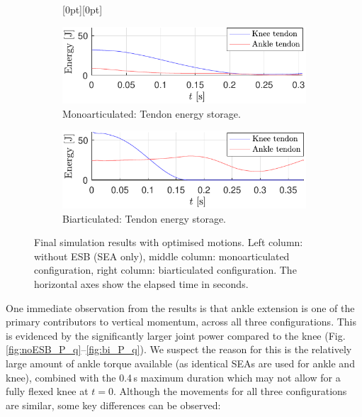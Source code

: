 \documentclass[letterpaper, 10 pt, conference]{ieeeconf}  %
\begin{document}
\begin{figure}[ht]
	\begin{subfigure}[t]{0.32\linewidth}
		\centering
		\raisebox{0pt}[0pt][0pt]{%
		}
	\end{subfigure}
	\begin{subfigure}[t]{0.32\linewidth}
		\includegraphics[width=\linewidth]{mono/ESB_storage}
		\caption{Monoarticulated: Tendon energy storage.}
		\label{fig:mono_ESB}
	\end{subfigure}
	\begin{subfigure}[t]{0.32\linewidth}
		\includegraphics[width=\linewidth]{bi/ESB_storage}
		\caption{Biarticulated: Tendon energy storage.}
		\label{fig:bi_ESB}
	\end{subfigure}
	
	\caption{Final simulation results with optimised motions. Left column: without ESB (SEA only), middle column: monoarticulated configuration, right column: biarticulated configuration. The horizontal axes show the elapsed time in seconds.}
	\label{fig:opt_results}
\end{figure}

One immediate observation from the results is that ankle extension is one of the primary contributors to vertical momentum, across all three configurations. This is evidenced by the significantly larger joint power compared to the knee (Fig. \ref{fig:noESB_P_q}--\ref{fig:bi_P_q}). We suspect the reason for this is the relatively large amount of ankle torque available (as identical SEAs are used for ankle and knee), combined with the 0.4\,s maximum duration which may not allow for a fully flexed knee at $t=0$. Although the movements for all three configurations are similar, some key differences can be observed:
\end{document}
